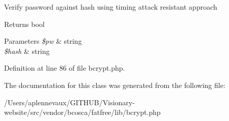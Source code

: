 Verify password against hash using timing attack resistant approach \begin{DoxyReturn}{Returns}
bool 
\end{DoxyReturn}

\begin{DoxyParams}{Parameters}
{\em \$pw} & string \\
\hline
{\em \$hash} & string \\
\hline
\end{DoxyParams}


Definition at line 86 of file bcrypt.\+php.



The documentation for this class was generated from the following file\+:\begin{DoxyCompactItemize}
\item 
/\+Users/aplennevaux/\+G\+I\+T\+H\+U\+B/\+Visionary-\/website/src/vendor/bcosca/fatfree/lib/bcrypt.\+php\end{DoxyCompactItemize}
